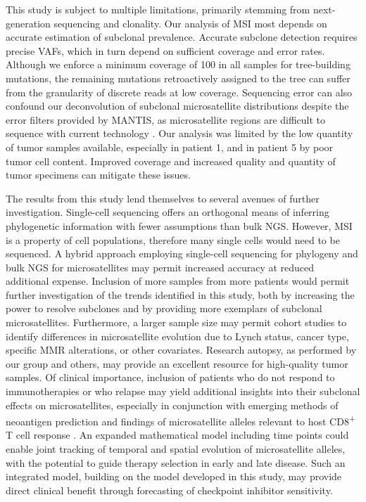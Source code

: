 This study is subject to multiple limitations, primarily stemming from next-generation sequencing and clonality. Our analysis of MSI most depends on accurate estimation of subclonal prevalence. Accurate subclone detection requires precise VAFs, which in turn depend on sufficient coverage and error rates. Although we enforce a minimum coverage of 100\texttimes{} in all samples for tree-building mutations, the remaining mutations retroactively assigned to the tree can suffer from the granularity of discrete reads at low coverage. Sequencing error can also confound our deconvolution of subclonal microsatellite distributions despite the error filters provided by MANTIS, as microsatellite regions are difficult to sequence with current technology \cite{zavodna2014}. Our analysis was limited by the low quantity of tumor samples available, especially in patient 1, and in patient 5 by poor tumor cell content. Improved coverage and increased quality and quantity of tumor specimens can mitigate these issues.

The results from this study lend themselves to several avenues of further investigation. Single-cell sequencing \cite{navin2011} offers an orthogonal means of inferring phylogenetic information with fewer assumptions than bulk NGS\@. However, MSI is a property of cell populations, therefore many single cells would need to be sequenced. A hybrid approach \cite{liu2017,walter2018} employing single-cell sequencing for phylogeny and bulk NGS for microsatellites may permit increased accuracy at reduced additional expense. Inclusion of more samples from more patients would permit further investigation of the trends identified in this study, both by increasing the power to resolve subclones and by providing more exemplars of subclonal microsatellites. Furthermore, a larger sample size may permit cohort studies to identify differences in microsatellite evolution due to Lynch status, cancer type, specific MMR alterations, or other covariates. Research autopsy, as performed by our group \cite{chen2019} and others, may provide an excellent resource for high-quality tumor samples. Of clinical importance, inclusion of patients who do not respond to immunotherapies or who relapse may yield additional insights into their subclonal effects on microsatellites, especially in conjunction with emerging methods of neoantigen prediction \cite{roudko2020} and findings of microsatellite alleles relevant to host CD8\textsuperscript{+} T cell response \cite{maby2016}. An expanded mathematical model including time points could enable joint tracking of temporal and spatial evolution of microsatellite alleles, with the potential to guide therapy selection in early and late disease. Such an integrated model, building on the model developed in this study, may provide direct clinical benefit through forecasting of checkpoint inhibitor sensitivity.

